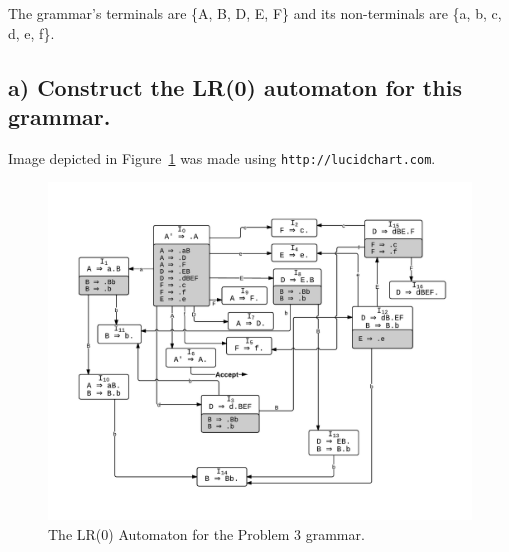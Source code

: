 The grammar's terminals are \{A, B, D, E, F\} and its non-terminals are \{a, b, c, d, e, f\}.


\subsection{a) Construct the LR(0) automaton for this grammar.}




Image depicted in Figure~\ref{fig:1-3-a} was made using \texttt{http://lucidchart.com}.

\begin{figure}[H]
\begin{center}
\includegraphics[width=\textwidth]{gfx/1-3-a.pdf}
\caption{The LR(0) Automaton for the Problem 3 grammar.}
\label{fig:1-3-a}
\end{center}
\end{figure}


